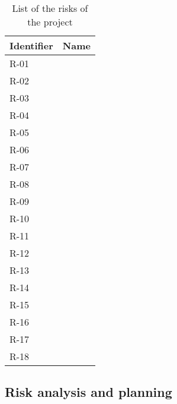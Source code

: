 \begin{table}[H]
	\begin{tabularx}{\textwidth}{|l|X|}
		\hline
		\rowcolor{gray!30}
		Identifier & Name \\ \hline
		R-01 & \Runo \\ \hline
		R-02 & \Rdos \\ \hline
		R-03 & \Rtres \\ \hline
		R-04 & \Rcuatro \\ \hline
		R-05 & \Rcinco \\ \hline
		R-06 & \Rseis \\ \hline
		R-07 & \Rsiete \\ \hline
		R-08 & \Rocho \\ \hline
		R-09 & \Rnueve \\ \hline
		R-10 & \Rdiez \\ \hline
		R-11 & \Ronce \\ \hline
		R-12 & \Rdoce \\ \hline
		R-13 & \Rtrece \\ \hline
		R-14 & \Rcatorce \\ \hline
		R-15 & \Rquince \\ \hline
		R-16 & \Rdieciseis \\ \hline
		R-17 & \Rdiecisiete \\ \hline
		R-18 & \Rdieciocho \\ \hline
	\end{tabularx}
	\caption{List of the risks of the project}
\end{table}





\subsection{Risk analysis and planning}


